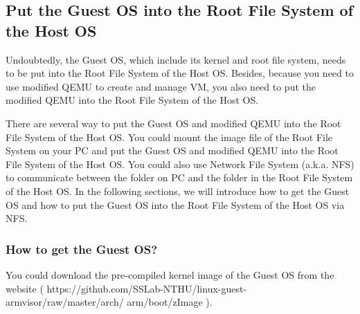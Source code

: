 \documentclass[12pt]{article}  %
\begin{document}
\subsection{Put the Guest OS into the Root File System of the Host OS}
Undoubtedly, the Guest OS, which include its kernel and root file system, needs to be put into the Root File System of the Host OS. Besides, because you need to use modified QEMU to create and manage VM, you also need to put the modified QEMU into the Root File System of the Host OS.

There are several way to put the Guest OS and modified QEMU into the Root File System of the Host OS. You could mount the image file of the Root File System on your PC and put the Guest OS and modified QEMU into the Root File System of the Host OS. You could also use Network File System (a.k.a. NFS) to communicate between the folder on PC and the folder in the Root File System of the Host OS. In the following sections, we will introduce how to get the Guest OS and how to put the Guest OS into the Root File System of the Host OS via NFS.

\subsubsection{How to get the Guest OS?}
You could download the pre-compiled kernel image of the Guest OS from the website ( https://github.com/SSLab-NTHU/linux-guest-armvisor/raw/master/arch/
arm/boot/zImage ).\newline
{}\newline
{}\newline
{}
\end{document}
